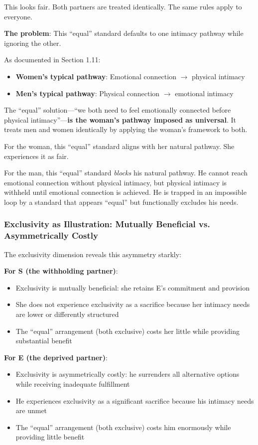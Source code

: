 \documentclass[12pt, letterpaper]{article}
\begin{document}
This looks fair. Both partners are treated identically. The same rules apply to everyone.

\textbf{The problem}: This ``equal'' standard defaults to one intimacy pathway while ignoring the other.

As documented in Section 1.11:
\begin{itemize}
    \item \textbf{Women's typical pathway}: Emotional connection $\rightarrow$ physical intimacy
    \item \textbf{Men's typical pathway}: Physical connection $\rightarrow$ emotional intimacy
\end{itemize}

The ``equal'' solution---``we both need to feel emotionally connected before physical intimacy''---\textbf{is the woman's pathway imposed as universal}. It treats men and women identically by applying the woman's framework to both.

For the woman, this ``equal'' standard aligns with her natural pathway. She experiences it as fair.

For the man, this ``equal'' standard \textit{blocks} his natural pathway. He cannot reach emotional connection without physical intimacy, but physical intimacy is withheld until emotional connection is achieved. He is trapped in an impossible loop by a standard that appears ``equal'' but functionally excludes his needs.

\subsubsection{Exclusivity as Illustration: Mutually Beneficial vs. Asymmetrically Costly}

The exclusivity dimension reveals this asymmetry starkly:

\textbf{For S (the withholding partner)}:
\begin{itemize}
    \item Exclusivity is mutually beneficial: she retains E's commitment and provision
    \item She does not experience exclusivity as a sacrifice because her intimacy needs are lower or differently structured
    \item The ``equal'' arrangement (both exclusive) costs her little while providing substantial benefit
\end{itemize}

\textbf{For E (the deprived partner)}:
\begin{itemize}
    \item Exclusivity is asymmetrically costly: he surrenders all alternative options while receiving inadequate fulfillment
    \item He experiences exclusivity as a significant sacrifice because his intimacy needs are unmet
    \item The ``equal'' arrangement (both exclusive) costs him enormously while providing little benefit
\end{itemize}
\end{document}
